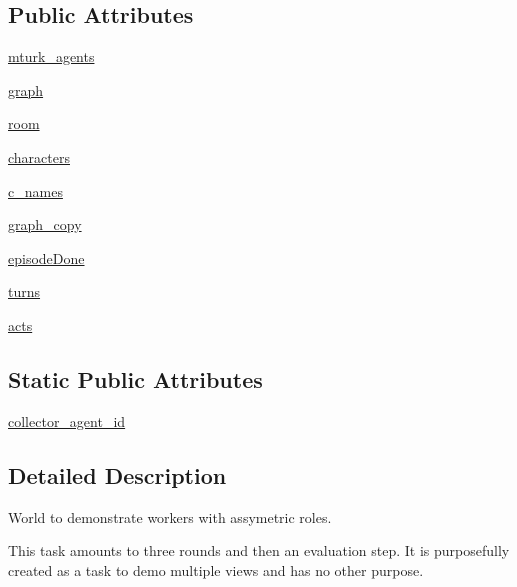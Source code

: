 \subsection*{Public Attributes}
\begin{DoxyCompactItemize}
\item 
\hyperlink{classlight__chats_1_1worlds_1_1LightChatTaskWorld_a03c483980d5fccf72cfa649cd03c2f77}{mturk\+\_\+agents}
\item 
\hyperlink{classlight__chats_1_1worlds_1_1LightChatTaskWorld_aded32ffc23a823ecc788982d2748fd18}{graph}
\item 
\hyperlink{classlight__chats_1_1worlds_1_1LightChatTaskWorld_a64f0056e716241b9baf5347bf6aa8b62}{room}
\item 
\hyperlink{classlight__chats_1_1worlds_1_1LightChatTaskWorld_a5da5f77b33e3893c9f699b809de9d451}{characters}
\item 
\hyperlink{classlight__chats_1_1worlds_1_1LightChatTaskWorld_ac0cf8e94d06f13b16c56ba58fbc2cf16}{c\+\_\+names}
\item 
\hyperlink{classlight__chats_1_1worlds_1_1LightChatTaskWorld_a48f8db77c1ddde1d617b8f14bfe7eef8}{graph\+\_\+copy}
\item 
\hyperlink{classlight__chats_1_1worlds_1_1LightChatTaskWorld_a9123e29fdef98b5ca9cb3b44a15c147c}{episode\+Done}
\item 
\hyperlink{classlight__chats_1_1worlds_1_1LightChatTaskWorld_aed1a391087a81f6a87105fcf4d769296}{turns}
\item 
\hyperlink{classlight__chats_1_1worlds_1_1LightChatTaskWorld_a2b2a14119080a436033495c597b6bbbf}{acts}
\end{DoxyCompactItemize}
\subsection*{Static Public Attributes}
\begin{DoxyCompactItemize}
\item 
\hyperlink{classlight__chats_1_1worlds_1_1LightChatTaskWorld_a8096a1f205a258689be1201abdf61517}{collector\+\_\+agent\+\_\+id}
\end{DoxyCompactItemize}


\subsection{Detailed Description}
\begin{DoxyVerb}World to demonstrate workers with assymetric roles.

This task amounts to three rounds and then an evaluation step. It is purposefully
created as a task to demo multiple views and has no other purpose.
\end{DoxyVerb}
 

